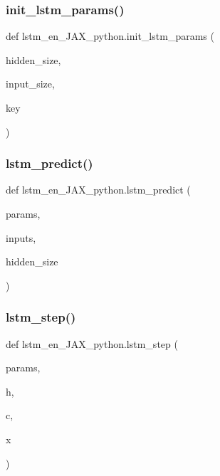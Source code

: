 \subsubsection{\texorpdfstring{init\+\_\+lstm\+\_\+params()}{init\_lstm\_params()}}
{\footnotesize\ttfamily def lstm\+\_\+en\+\_\+\+J\+A\+X\+\_\+python.\+init\+\_\+lstm\+\_\+params (\begin{DoxyParamCaption}\item[{}]{hidden\+\_\+size,  }\item[{}]{input\+\_\+size,  }\item[{}]{key }\end{DoxyParamCaption})}

\mbox{\label{namespacelstm__en__JAX__python_a11bf77a2c3fc11105d4d29944e565986}} 
\subsubsection{\texorpdfstring{lstm\+\_\+predict()}{lstm\_predict()}}
{\footnotesize\ttfamily def lstm\+\_\+en\+\_\+\+J\+A\+X\+\_\+python.\+lstm\+\_\+predict (\begin{DoxyParamCaption}\item[{}]{params,  }\item[{}]{inputs,  }\item[{}]{hidden\+\_\+size }\end{DoxyParamCaption})}

\mbox{\label{namespacelstm__en__JAX__python_ac13ce59fe2b765416eb40e41654be652}} 
\subsubsection{\texorpdfstring{lstm\+\_\+step()}{lstm\_step()}}
{\footnotesize\ttfamily def lstm\+\_\+en\+\_\+\+J\+A\+X\+\_\+python.\+lstm\+\_\+step (\begin{DoxyParamCaption}\item[{}]{params,  }\item[{}]{h,  }\item[{}]{c,  }\item[{}]{x }\end{DoxyParamCaption})}



